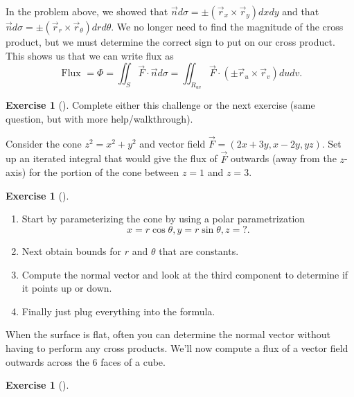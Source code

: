 \documentclass[10pt,]{book}
\theoremstyle{plain}
\theoremstyle{definition}
\theoremstyle{definition}
\theoremstyle{definition}
\theoremstyle{definition}
\newtheorem{exploration}[project]{Exercise}
\theoremstyle{definition}
\numberwithin{equation}{section}
\begin{document}
In the problem above, we showed that \(\vec n d\sigma = \pm(\vec r_x\times\vec r_y)dxdy\) and that \(\vec n d\sigma = \pm(\vec r_r\times\vec r_\theta)drd\theta\). We no longer need to find the magnitude of the cross product, but we must determine the correct sign to put on our cross product. This shows us that we can write flux as%
\begin{equation*}
\text{ Flux } =\Phi 
= \iint_S \vec F\cdot \vec n d\sigma 
= \iint_{R_{uv}} \vec F\cdot (\pm \vec r_u\times \vec r_v) dudv
.
\end{equation*}
%
\begin{exploration}[]\label{exploration-284}
Complete either this challenge or the next exercise (same question, but with more help/walkthrough).%
\par
Consider the cone \(z^2=x^2+y^2\) and vector field \(\vec F = (2x+3y, x-2y, yz)\). Set up an iterated integral that would give the flux of \(\vec F\) outwards (away from the \(z\)-axis) for the portion of the cone between \(z=1\) and \(z=3\).%
\end{exploration}
\begin{exploration}[]\label{exploration-285}
\leavevmode%
\begin{enumerate}[font=\bfseries,label=(\alph*),ref=\alph*]
\item\label{task-772} Start by  parameterizing the cone by using a polar parametrization%
\begin{equation*}
x=r\cos\theta, y=r\sin\theta, z=?.
\end{equation*}
%
\item\label{task-773} Next obtain bounds for \(r\) and \(\theta\) that are constants.%
\item\label{task-774} Compute the normal vector and look at the third component to determine if it points up or down.%
\item\label{task-775} Finally just plug everything into the formula.%
\end{enumerate}
\end{exploration}
When the surface is flat, often you can determine the normal vector without having to perform any cross products. We'll now compute a flux of a vector field outwards across the 6 faces of a cube.%
\begin{exploration}[]\label{boxflux}
\end{exploration}
\typeout{************************************************}
\typeout{************************************************}
\end{document}
